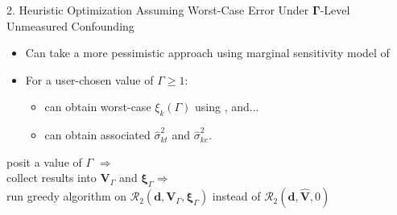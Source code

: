 \documentclass[usenames,dvipsnames]{beamer}
\newcommand{\bsxi}{\boldsymbol{\xi}}
\let\oldcite=\cite
\renewcommand{\cite}[1]{\textcolor[rgb]{.3,.3,.8}{\oldcite{#1}}}
\theoremstyle{definition} %
\begin{document}
\begin{frame}{2. Heuristic Optimization Assuming Worst-Case Error Under $\boldsymbol \Gamma$-Level Unmeasured Confounding}

\begin{itemize}
\item Can take a more pessimistic approach using marginal sensitivity model of \cite{tan2006distributional} 
\item For a user-chosen value of $\Gamma \geq 1$: 
\begin{itemize}
\item can obtain worst-case $\xi_k(\Gamma)$ using  \cite{zhao2019sensitivity}, and...
\item can obtain associated $\hat \sigma_{kt}^2$ and $\hat \sigma_{kc}^2$. \\
\end{itemize}
\end{itemize} \pause
\vspace{5mm}
posit a value of $\Gamma$ $\Longrightarrow$ \\
\hspace{3mm} collect results into  $\boldsymbol V_{\Gamma}$ and $\bsxi_{\Gamma}$$\Longrightarrow$   \\
\hspace{6mm} run greedy algorithm on $\mathcal{R}_2(\boldsymbol d, \boldsymbol V_{\Gamma}, \bsxi_{\Gamma})$ instead of $\mathcal{R}_2(\boldsymbol d, \boldsymbol{ \hat V}, 0)$
\end{frame}
\end{document}
